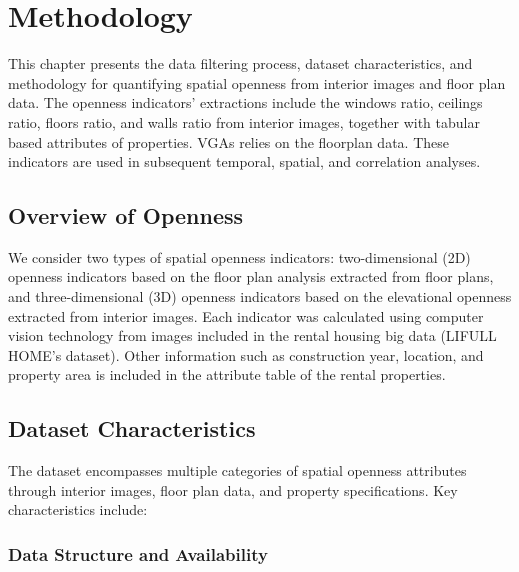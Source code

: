 \chapter{Methodology}

This chapter presents the data filtering process, dataset characteristics, and methodology for quantifying spatial 
openness from interior images and floor plan data. The openness indicators' extractions include the windows ratio, ceilings ratio, floors ratio, 
and walls ratio from interior images, together with tabular based attributes of properties. 
VGAs relies on the floorplan data.
These indicators are used in subsequent temporal, spatial, and correlation analyses.



\section{Overview of Openness }

We consider two types of spatial openness indicators: two-dimensional (2D) openness indicators based 
on the floor plan analysis extracted from floor plans, and three-dimensional (3D) openness indicators based 
on the elevational openness extracted from interior images. Each indicator was calculated using computer 
vision technology from images included in the rental housing big data (LIFULL HOME's dataset). Other 
information such as construction year, location, and property area is included in the attribute table of the 
rental properties.

\section{Dataset Characteristics}

The dataset encompasses multiple categories of spatial openness attributes through interior images, floor plan data, 
and property specifications. Key characteristics include:


\subsection{Data Structure and Availability}

